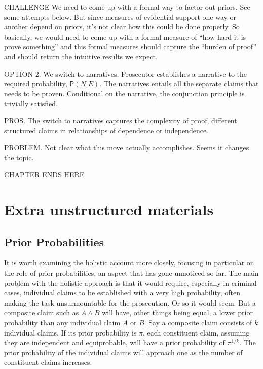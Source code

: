 \documentclass[
  10pt,
  dvipsnames,enabledeprecatedfontcommands]{scrartcl}
\newcommand{\pr}[1]{\mathsf{P}(#1)}
\begin{document}
CHALLENGE We need to come up with a formal way to factor out priors. See
some attempts below. But since measures of evidential support one way or
another depend on priors, it's not clear how this could be done
properly. So basically, we would need to come up with a formal measure
of ``how hard it is prove something'' and this formal measures should
capture the ``burden of proof'' and should return the intuitive results
we expect.

OPTION 2. We switch to narratives. Prosecutor establishes a narrative to
the required probability, \(\pr{N \vert E}\). The narratives entails all
the separate claims that needs to be proven. Conditional on the
narrative, the conjunction principle is trivially satisfied.

PROS. The switch to narratives captures the complexity of proof,
different structured claims in relationships of dependence or
independence.

PROBLEM. Not clear what this move actually accomplishes. Seems it
changes the topic.

\noindent\makebox[\linewidth]{\rule{\paperwidth}{1pt}}

CHAPTER ENDS HERE

\noindent\makebox[\linewidth]{\rule{\paperwidth}{1pt}}

\hypertarget{extra-unstructured-materials}{%
\section{Extra unstructured
materials}\label{extra-unstructured-materials}}

\hypertarget{prior-probabilities}{%
\subsection{Prior Probabilities}\label{prior-probabilities}}

It is worth examining the holistic account more closely, focusing in
particular on the role of prior probabilities, an aspect that has gone
unnoticed so far. The main problem with the holistic approach is that it
would require, especially in criminal cases, individual claims to be
established with a very high probability, often making the task
unsurmountable for the prosecution. Or so it would seem. But a composite
claim such as \(A\wedge B\) will have, other things being equal, a lower
prior probability than any individual claim \(A\) or \(B\). Say a
composite claim consists of \(k\) individual claims. If its prior
probability is \(\pi\), each constituent claim, assuming they are
independent and equiprobable, will have a prior probability of
\(\pi^{1/k}\). The prior probability of the individual claims will
approach one as the number of constituent claims increases.
\end{document}
